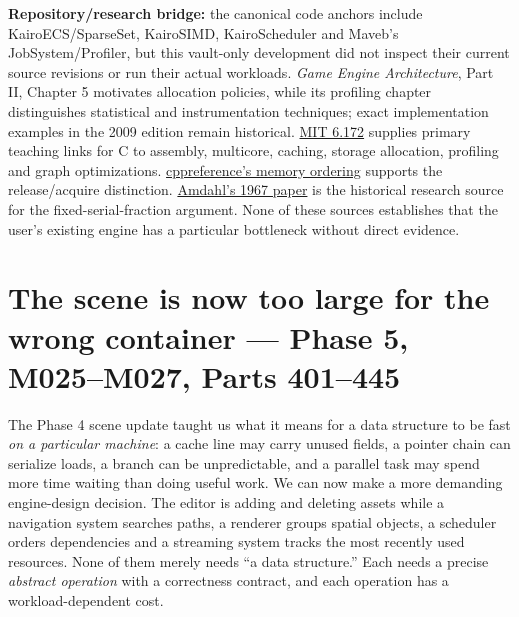 \textbf{Repository/research bridge:} the canonical code anchors include KairoECS/SparseSet, KairoSIMD, KairoScheduler and Maveb's JobSystem/Profiler, but this vault-only development did not inspect their current source revisions or run their actual workloads. \emph{Game Engine Architecture}, Part II, Chapter 5 motivates allocation policies, while its profiling chapter distinguishes statistical and instrumentation techniques; exact implementation examples in the 2009 edition remain historical. \href{https://ocw.mit.edu/courses/6-172-performance-engineering-of-software-systems-fall-2018/video_galleries/lecture-videos/}{MIT 6.172} supplies primary teaching links for C to assembly, multicore, caching, storage allocation, profiling and graph optimizations. \href{https://en.cppreference.com/w/cpp/atomic/memory_order}{cppreference's memory ordering} supports the release/acquire distinction. \href{https://doi.org/10.1145/1465482.1465560}{Amdahl's 1967 paper} is the historical research source for the fixed-serial-fraction argument. None of these sources establishes that the user's existing engine has a particular bottleneck without direct evidence.

\section{The scene is now too large for the wrong container --- Phase 5, M025--M027, Parts 401--445}\label{01-foundations-i-ch007-the-scene-is-now-too-large-for-the-wrong-container-phase-5-m025m027-parts-401445}

The Phase 4 scene update taught us what it means for a data structure to be fast \emph{on a particular machine}: a cache line may carry unused fields, a pointer chain can serialize loads, a branch can be unpredictable, and a parallel task may spend more time waiting than doing useful work. We can now make a more demanding engine-design decision. The editor is adding and deleting assets while a navigation system searches paths, a renderer groups spatial objects, a scheduler orders dependencies and a streaming system tracks the most recently used resources. None of them merely needs ``a data structure.'' Each needs a precise \emph{abstract operation} with a correctness contract, and each operation has a workload-dependent cost.

